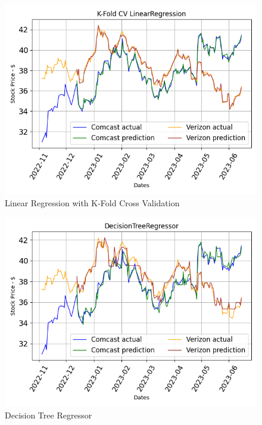 \documentclass[conference]{IEEEtran}
\begin{document}
\begin{figure}
    \includegraphics[width=\columnwidth]{K-Fold CV LinearRegression}
    \caption{Linear Regression with K-Fold Cross Validation}
    \label{fig:kflr}
\end{figure}

\begin{figure}
    \includegraphics[width=\columnwidth]{DecisionTreeRegressor}
    \caption{Decision Tree Regressor}
    \label{fig:dt}
\end{figure}
\end{document}
